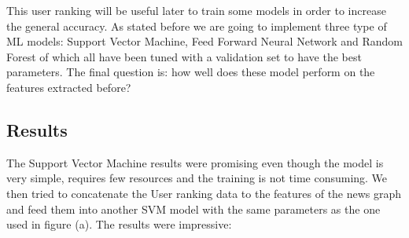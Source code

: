\documentclass[11pt,a4paper]{article}
\begin{document}
This user ranking will be useful later to train some models in order to increase the general accuracy. As stated before we are going to implement three type of ML models: Support Vector Machine, Feed Forward Neural Network and Random Forest of which all have been tuned with a validation set to have the best parameters.
The final question is: how well does these model perform on the features extracted before?

\newpage

\subsection*{Results}

\begin{figure}[h]
    \centering
\end{figure}

The Support Vector Machine results were promising even though the model is very simple, requires few resources and the training is not time consuming. We then tried to concatenate the User ranking data to the features of the news graph and feed them into another SVM model with the same parameters as the one used in figure (a). The results were impressive:
\end{document}
